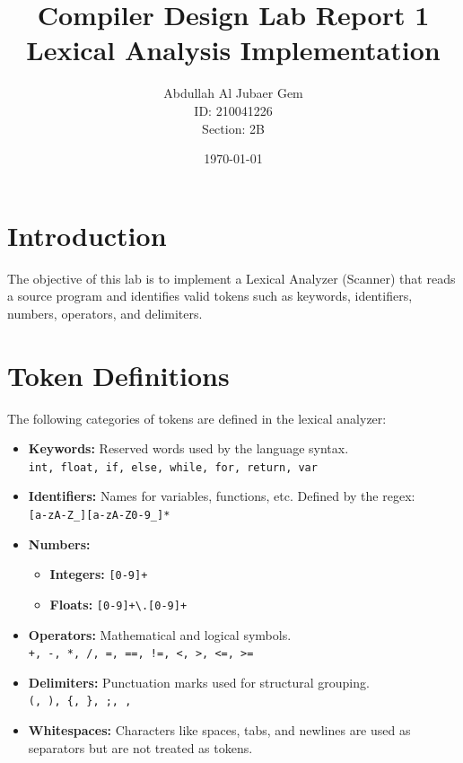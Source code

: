 \documentclass{article}
\title{Compiler Design Lab Report 1\\Lexical Analysis Implementation}
\author{Abdullah Al Jubaer Gem\\ID: 210041226\\Section: 2B}
\date{\today}
\begin{document}
\maketitle

\section{Introduction}
The objective of this lab is to implement a Lexical Analyzer (Scanner) that reads a source program and identifies valid tokens such as keywords, identifiers, numbers, operators, and delimiters.

\section{Token Definitions}
The following categories of tokens are defined in the lexical analyzer:

\begin{itemize}
    \item \textbf{Keywords:} Reserved words used by the language syntax. 
    \\ \texttt{int, float, if, else, while, for, return, var}
    
    \item \textbf{Identifiers:} Names for variables, functions, etc. Defined by the regex:
    \\ \texttt{[a-zA-Z\_][a-zA-Z0-9\_]*}
    
    \item \textbf{Numbers:} 
    \begin{itemize}
        \item \textbf{Integers:} \texttt{[0-9]+}
        \item \textbf{Floats:} \texttt{[0-9]+\textbackslash.[0-9]+}
    \end{itemize}
    
    \item \textbf{Operators:} Mathematical and logical symbols.
    \\ \texttt{+, -, *, /, =, ==, !=, <, >, <=, >=}
    
    \item \textbf{Delimiters:} Punctuation marks used for structural grouping.
    \\ \texttt{(, ), \{, \}, ;, ,}
    
    \item \textbf{Whitespaces:} Characters like spaces, tabs, and newlines are used as separators but are not treated as tokens.
\end{itemize}
\end{document}
